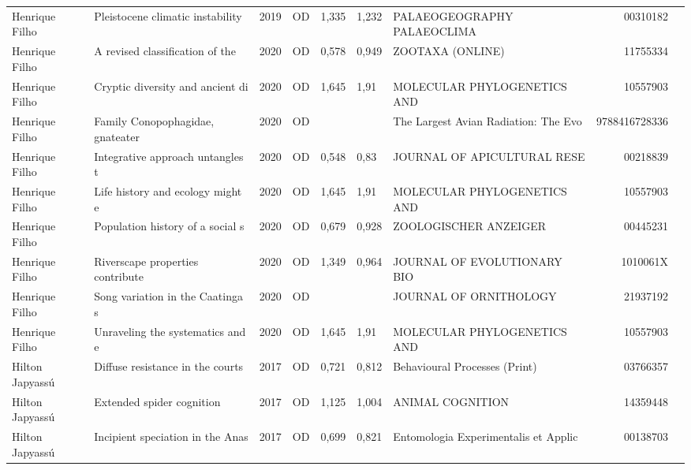 \documentclass[12pt,brazil]{article}\usepackage[]{graphicx}\usepackage[]{xcolor}
\begin{document}
\begin{longtable}{lllrrllrr}
\rowcolor{coautr}\rowcolor{coautr}\rowcolor{coautr}\rowcolor{coautr}\rowcolor{coautr}\rowcolor{coautr}\rowcolor{coautr}\rowcolor{coautr}\rowcolor{coautr}\rowcolor{coautr}\rowcolor{coautr}\rowcolor{coautr}\rowcolor{coautr}\rowcolor{coautr}\rowcolor{coautr}\rowcolor{coautr}Henrique Filho & Pleistocene climatic instability & 2019 & OD & 1,335 & 1,232 & PALAEOGEOGRAPHY PALAEOCLIMA & 00310182 \\
Henrique Filho & A revised classification of the  & 2020 & OD & 0,578 & 0,949 & ZOOTAXA (ONLINE) & 11755334 \\
Henrique Filho & Cryptic diversity and ancient di & 2020 & OD & 1,645 & 1,91 & MOLECULAR PHYLOGENETICS AND & 10557903 \\
Henrique Filho & Family Conopophagidae, gnateater & 2020 & OD &  &  & The Largest Avian Radiation: The Evo & 9788416728336 \\
Henrique Filho & Integrative approach untangles t & 2020 & OD & 0,548 & 0,83 & JOURNAL OF APICULTURAL RESE & 00218839 \\
Henrique Filho & Life history and ecology might e & 2020 & OD & 1,645 & 1,91 & MOLECULAR PHYLOGENETICS AND & 10557903 \\
\rowcolor{coautr}\rowcolor{coautr}\rowcolor{coautr}\rowcolor{coautr}\rowcolor{coautr}\rowcolor{coautr}\rowcolor{coautr}\rowcolor{coautr}\rowcolor{coautr}\rowcolor{coautr}\rowcolor{coautr}\rowcolor{coautr}\rowcolor{coautr}\rowcolor{coautr}\rowcolor{coautr}\rowcolor{coautr}Henrique Filho & Population history of a social s & 2020 & OD & 0,679 & 0,928 & ZOOLOGISCHER ANZEIGER & 00445231 \\
Henrique Filho & Riverscape properties contribute & 2020 & OD & 1,349 & 0,964 & JOURNAL OF EVOLUTIONARY BIO & 1010061X \\
Henrique Filho & Song variation in the Caatinga s & 2020 & OD &  &  & JOURNAL OF ORNITHOLOGY & 21937192 \\
Henrique Filho & Unraveling the systematics and e & 2020 & OD & 1,645 & 1,91 & MOLECULAR PHYLOGENETICS AND & 10557903 \\
Hilton Japyassú & Diffuse resistance in the courts & 2017 & OD & 0,721 & 0,812 & Behavioural Processes (Print) & 03766357 \\
Hilton Japyassú & Extended spider cognition & 2017 & OD & 1,125 & 1,004 & ANIMAL COGNITION & 14359448 \\
Hilton Japyassú & Incipient speciation in the Anas & 2017 & OD & 0,699 & 0,821 & Entomologia Experimentalis et Applic & 00138703 \\

\end{longtable}
\end{document}
